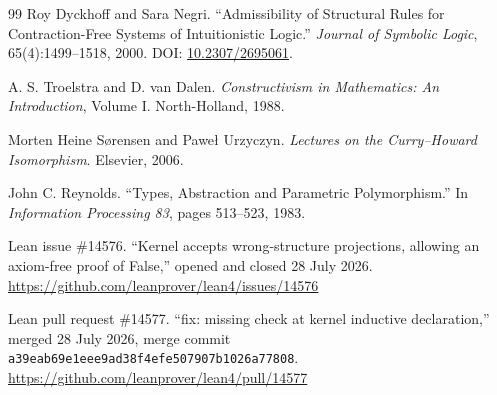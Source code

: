\documentclass[11pt,letterpaper,openany]{report}
\theoremstyle{definition}
\theoremstyle{remark}
\newcommand{\commit}[1]{\texttt{\small #1}}
\begin{document}
\begin{thebibliography}{99}
Roy Dyckhoff and Sara Negri.
``Admissibility of Structural Rules for Contraction-Free Systems of Intuitionistic Logic.''
\emph{Journal of Symbolic Logic}, 65(4):1499--1518, 2000.
DOI: \href{https://doi.org/10.2307/2695061}{10.2307/2695061}.

A. S. Troelstra and D. van Dalen.
\emph{Constructivism in Mathematics: An Introduction}, Volume I.
North-Holland, 1988.

Morten Heine S\o rensen and Pawe\l{} Urzyczyn.
\emph{Lectures on the Curry--Howard Isomorphism}.
Elsevier, 2006.

John C. Reynolds.
``Types, Abstraction and Parametric Polymorphism.''
In \emph{Information Processing 83}, pages 513--523, 1983.

Lean issue \#14576.
``Kernel accepts wrong-structure projections, allowing an axiom-free proof of False,'' opened and closed 28 July 2026.
\url{https://github.com/leanprover/lean4/issues/14576}

Lean pull request \#14577.
``fix: missing check at kernel inductive declaration,'' merged 28 July 2026, merge commit
\commit{a39eab69e1eee9ad38f4efe507907b1026a77808}.
\url{https://github.com/leanprover/lean4/pull/14577}

\end{thebibliography}
\end{document}
